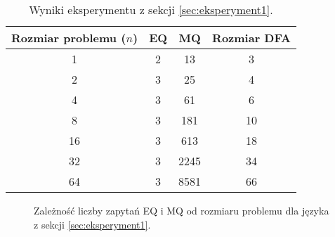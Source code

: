 \begin{table}[ht]
\centering
\caption{Wyniki eksperymentu z sekcji \ref{sec:eksperyment1}.}
\label{tab:lstar_prefix}
\begin{tabular}{|c|c|c|c|}
\hline
Rozmiar problemu (\(n\)) & EQ & MQ & Rozmiar DFA \\ \hline
1                        & 2  & 13 & 3           \\ \hline
2                        & 3  & 25 & 4           \\ \hline
4                        & 3  & 61 & 6           \\ \hline
8                        & 3  & 181 & 10         \\ \hline
16                       & 3  & 613 & 18         \\ \hline
32                       & 3  & 2245 & 34        \\ \hline
64                       & 3  & 8581 & 66        \\ \hline
\end{tabular}
\end{table}

\begin{figure}[ht]
\centering
{}
\caption{Zależność liczby zapytań EQ i MQ od rozmiaru problemu dla języka z sekcji \ref{sec:eksperyment1}.}
\label{fig:lstar_prefix_mq}
\end{figure}

